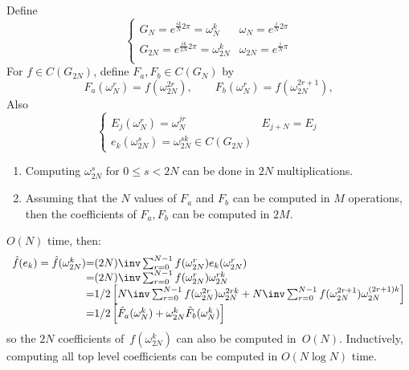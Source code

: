 Define 
\[
\begin{cases}
  G_N=e^{\frac{ik}N  2\pi}=\omega_N^k&\omega_N=e^{\frac iN2\pi}\\
  G_{2N}=e^{\frac{ik}{2N} 2\pi}=\omega_{2N}^k&\omega_{2N}=e^{\frac iN\pi}\\
\end{cases}
\]
For $f\in C(G_{2N})$,
define $F_a,F_b\in C(G_N)$ by
\[
    F_a(\omega^r_N) = f(\omega^{2r}_{2N}),\qquad
    F_b(\omega^r_N) = f(\omega^{2r+1}_{2N}),
\]
Also
\[
\begin{cases}
  E_j(\omega_N^r) = \omega_N^{jr} & E_{j+N}=E_j\\
  e_k(\omega_{2N}^s) = \omega_{2N}^{sk}\in C(G_{2N})
\end{cases}
\]
\begin{enumerate}
\item Computing $\omega_{2N}^s$ for $0\leq s<2N$ can be done in $2N$
  multiplications.
\item Assuming that the $N$ values of $F_a$ and $F_b$ can be computed
  in $M$ operations, then the coefficients of $F_a,F_b$ can be
  computed in $2M$.
\end{enumerate}
$O(N)$ time, then:
\[
\begin{array}{r@{=}l}
  \hat f(e_k) = \hat f(\omega^k_{2N})
    &(2N)\inv \sum_{r=0}^{N-1} f(\omega^r_{2N})e_k(\omega_{2N}^r)\\
    &(2N)\inv \sum_{r=0}^{N-1} f(\omega^r_{2N})\omega^{rk}_{2N}\\
    &1/2\left[
      N\inv\sum_{r=0}^{N-1}f(\omega^{2r}_{2N})\omega^{2rk}_{2N}+
      N\inv\sum_{r=0}^{N-1}f(\omega^{2r+1}_{2N})\omega^{(2r+1)k}_{2N}
      \right]\\
    &1/2\left[ \hat F_a(\omega^k_N) + \omega^k_{2N}\hat
      F_b(\omega^k_N) \right]\\    
\end{array}
\]
so the $2N$ coefficients of~$f(\omega^k_{2N})$ can also be computed
in~$O(N)$. Inductively, computing all top level coefficients can be
computed in $O(N\log N)$ time.


